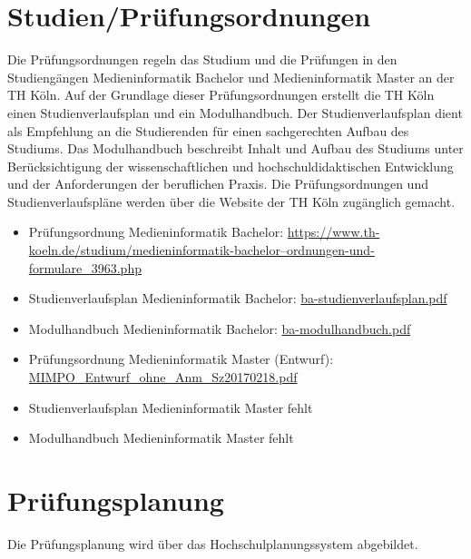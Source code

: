 \section{Studien/Prüfungsordnungen}\label{studienpruxfcfungsordnungen-1}

Die Prüfungsordnungen regeln das Studium und die Prüfungen in den
Studiengängen Medieninformatik Bachelor und Medieninformatik Master an
der TH Köln. Auf der Grundlage dieser Prüfungsordnungen erstellt die TH
Köln einen Studienverlaufsplan und ein Modulhandbuch. Der
Studienverlaufsplan dient als Empfehlung an die Studierenden für einen
sachgerechten Aufbau des Studiums. Das Modulhandbuch beschreibt Inhalt
und Aufbau des Studiums unter Berücksichtigung der wissenschaftlichen
und hochschuldidaktischen Entwicklung und der Anforderungen der
beruflichen Praxis. Die Prüfungsordnungen und Studienverlaufspläne
werden über die Website der TH Köln zugänglich gemacht.

\begin{itemize}
\tightlist
\item
  Prüfungsordnung Medieninformatik Bachelor:
  \href{https://www.th-koeln.de/studium/medieninformatik-bachelor--ordnungen-und-formulare_3963.php}{https://www.th-koeln.de/studium/medieninformatik-bachelor--ordnungen-und-formulare\_3963.php}
\item
  Studienverlaufsplan Medieninformatik Bachelor:
  \href{https://th-koeln.github.io/mi-2017/anhaenge/ba-studienverlaufsplan.pdf}{ba-studienverlaufsplan.pdf}
\item
  Modulhandbuch Medieninformatik Bachelor:
  \href{https://th-koeln.github.io/mi-2017/anhaenge/ba-modulhandbuch.pdf}{ba-modulhandbuch.pdf}
\item
  Prüfungsordnung Medieninformatik Master (Entwurf):
  \href{https://th-koeln.github.io/mi-2017/anhaenge/MIMPO_Entwurf_ohne_Anm_Sz20170218.pdf}{MIMPO\_Entwurf\_ohne\_Anm\_Sz20170218.pdf}
\item
  Studienverlaufsplan Medieninformatik Master fehlt
\item
  Modulhandbuch Medieninformatik Master fehlt
\end{itemize}

\section{Prüfungsplanung}\label{pruxfcfungsplanung}

Die Prüfungsplanung wird über das Hochschulplanungssystem abgebildet.

